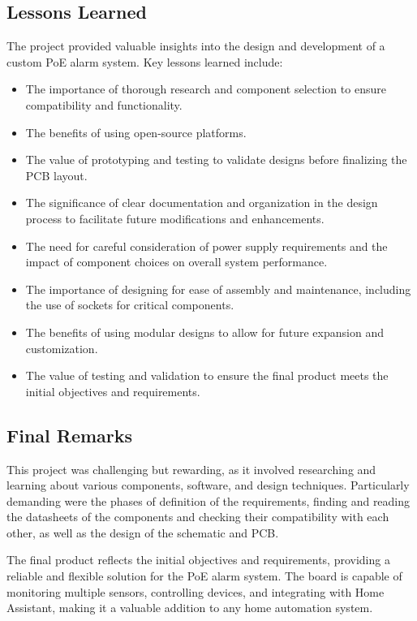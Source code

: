 \documentclass[a4paper,12pt]{article}
\begin{document}
\subsection{Lessons Learned}
The project provided valuable insights into the design and development of a custom PoE alarm system. Key lessons learned include:
\begin{itemize}
    \item The importance of thorough research and component selection to ensure compatibility and functionality.
    \item The benefits of using open-source platforms.
    \item The value of prototyping and testing to validate designs before finalizing the PCB layout.
    \item The significance of clear documentation and organization in the design process to facilitate future modifications and enhancements.
    \item The need for careful consideration of power supply requirements and the impact of component choices on overall system performance.
    \item The importance of designing for ease of assembly and maintenance, including the use of sockets for critical components.
    \item The benefits of using modular designs to allow for future expansion and customization.
    \item The value of testing and validation to ensure the final product meets the initial objectives and requirements.
\end{itemize}

\subsection{Final Remarks}
This project was challenging but rewarding, as it involved researching and learning about various components, software, and design techniques. Particularly demanding were the phases of definition of the requirements, finding and reading the datasheets of the components and checking their compatibility with each other, as well as the design of the schematic and PCB. 

The final product reflects the initial objectives and requirements, providing a reliable and flexible solution for the PoE alarm system. The board is capable of monitoring multiple sensors, controlling devices, and integrating with Home Assistant, making it a valuable addition to any home automation system.

\newpage


\end{document}
